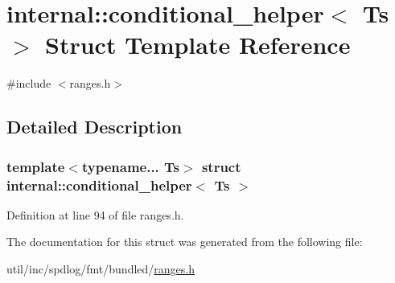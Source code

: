 \hypertarget{structinternal_1_1conditional__helper}{}\section{internal\+:\+:conditional\+\_\+helper$<$ Ts $>$ Struct Template Reference}
\label{structinternal_1_1conditional__helper}


{\ttfamily \#include $<$ranges.\+h$>$}



\subsection{Detailed Description}
\subsubsection*{template$<$typename... Ts$>$\newline
struct internal\+::conditional\+\_\+helper$<$ Ts $>$}



Definition at line 94 of file ranges.\+h.



The documentation for this struct was generated from the following file\+:\begin{DoxyCompactItemize}
\item 
util/inc/spdlog/fmt/bundled/\hyperlink{ranges_8h}{ranges.\+h}\end{DoxyCompactItemize}
